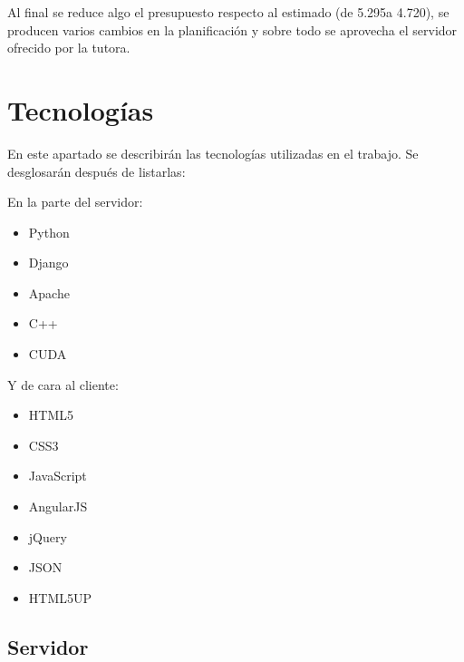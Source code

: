 Al final se reduce algo el presupuesto respecto al estimado (de 5.295\officialeuro a 4.720\officialeuro), se producen varios cambios en la planificación y sobre todo se aprovecha el servidor ofrecido por la tutora.

\newpage
\section{Tecnologías}

En este apartado se describirán las tecnologías utilizadas en el trabajo. Se desglosarán después de listarlas:

\bigskip
En la parte del servidor:
\begin{itemize}
	\item Python \cite{python}
	\item Django \cite{django}
	\item Apache \cite{apache}
	\item C++ \cite{cpp}
	\item CUDA \cite{nvidiacuda}
\end{itemize}

Y de cara al cliente:
\begin{itemize}
	\item HTML5 \cite{html}
	\item CSS3 \cite{css}
	\item JavaScript \cite{js}
	\item AngularJS \cite{angularjs}
	\item jQuery \cite{jquery}
	\item JSON \cite{json}
	\item HTML5UP \cite{htmlup}
\end{itemize}

\bigskip
\subsection{Servidor}
\bigskip

